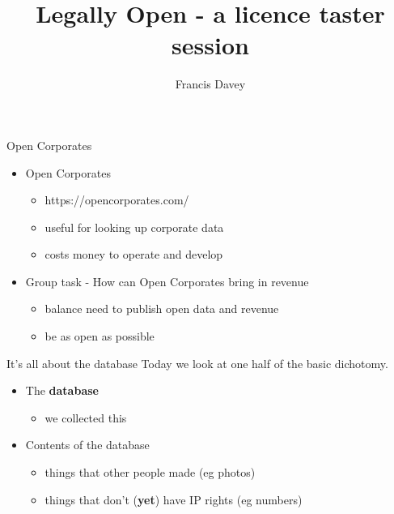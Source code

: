 \documentclass{beamer}
\title{Legally Open - a licence taster session}
\author{Francis Davey}
\begin{document}
\begin{frame}
  \titlepage
\end{frame}

\begin{frame}{Open Corporates}
  \begin{itemize}
  \item Open Corporates
    \begin{itemize}
    \item https://opencorporates.com/
    \item useful for looking up corporate data
    \item costs money to operate and develop
    \end{itemize}
  \item Group task - How can Open Corporates bring in revenue
    \begin{itemize}
    \item balance need to publish open data and revenue
    \item be as open as possible
    \end{itemize}
  \end{itemize}

\end{frame}

\begin{frame}{It's all about the database}
Today we look at one half of the basic dichotomy.
  \begin{itemize}
  \item The {\bf database}
    \begin{itemize}
    \item we collected this
    \end{itemize}
  \item Contents of the database
    \begin{itemize}
    \item things that other people made (eg photos)
    \item things that don't ({\bf yet}) have IP rights (eg numbers)
    \end{itemize}
  \end{itemize}
\end{frame}
\end{document}
